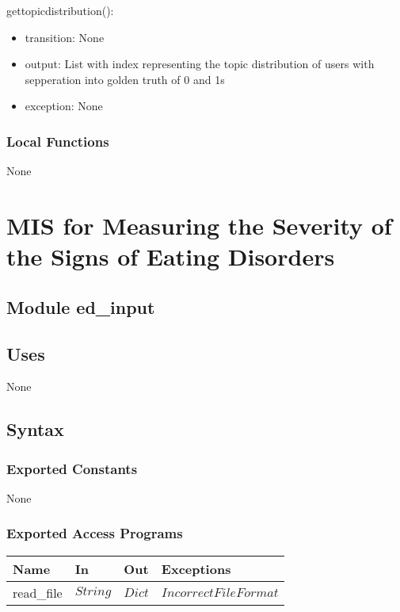 \documentclass[12pt, titlepage]{article}
\begin{document}
\noindent gettopicdistribution():
\begin{itemize}
\item transition: None
\item output: List with index representing the topic distribution of users with sepperation into golden truth of 0 and 1s
\item exception: None
\end{itemize}

\subsubsection{Local Functions}

None

\newpage

\section{MIS for Measuring the Severity of the Signs of Eating Disorders} \label{Module}

\subsection{Module ed\_input}

\subsection{Uses}

None

\subsection{Syntax}

\subsubsection{Exported Constants}

None

\subsubsection{Exported Access Programs}

\begin{center}
\begin{tabular}{p{2cm} p{3cm} p{3cm} p{4cm}}
\hline
\textbf{Name} & \textbf{In} & \textbf{Out} & \textbf{Exceptions} \\
\hline
read\_file & $String$ & $Dict$ & $IncorrectFileFormat$ \\
\hline
\end{tabular}
\end{center}
\end{document}

